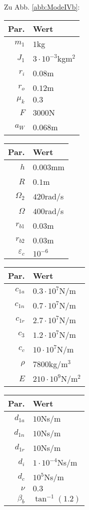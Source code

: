 Zu Abb. \ref{abb:ModeIVb}: 
\begin{center}
	\begin{tabular}{r|l}
		Par.&Wert\\\hline
		$m_1$&$1$kg\\
		$J_1$&$3\cdot10^{-3}$kgm$^2$\\
		$r_i$&$0.08$m\\
		$r_o$&$0.12$m\\
		$\mu_k$& $0.3$\\
		$F$&$3000$N\\
		$a_W$&$0.068$m\\
	\end{tabular}\hfill
	\begin{tabular}{r|l}
		Par.&Wert\\\hline
		$h$&$0.003$mm\\
		$R$&$0.1$m\\
		$\Omega_2$&$420$rad/s\\
		$\Omega$& $400$rad/s \\
		$r_{b1}$&$0.03$m\\
		$r_{b2}$&$0.03$m\\
		$\varepsilon_{c}$&$10^{-6}$\\
	\end{tabular}\hfill
	\begin{tabular}{r|l}
		Par.&Wert\\\hline
		$c_{1a}$&$0.3\cdot10^{7}$N/m\\
		$c_{1n}$&$0.7\cdot10^{7}$N/m\\
		$c_{1r}$&$2.7\cdot10^{7}$N/m\\
		$c_{3}$&$1.2\cdot10^{7}$N/m\\
		$c_{c}$&$10\cdot10^{7}$N/m\\
		$\rho$&$7800$kg/m$^3$\\
		$E$&$210\cdot10^9$N/m$^2$\\
	\end{tabular}\hfill
	\begin{tabular}{r|l}
		Par.&Wert\\\hline
		$d_{1a}$&$10$Ns/m\\
		$d_{1n}$&$10$Ns/m\\
		$d_{1r}$&$10$Ns/m\\
		$d_i$ &$1\cdot10^{-4}$Ns/m\\
		$d_c$ &$10^{5}$Ns/m\\
		$\nu$&$0.3$\\
		$\beta_b$&$\tan^{-1}(1.2)$
	\end{tabular}
\end{center}


